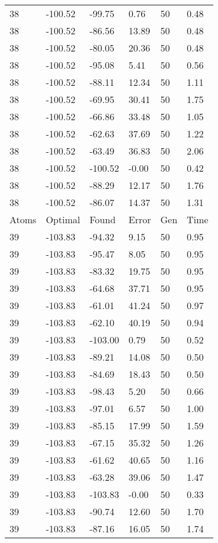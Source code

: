 \documentclass{report}
\begin{document}
\begin{appendix}
\begin{longtable}{llllll}
38 & -100.52 & -99.75 & 0.76 & 50 & 0.48 \\
38 & -100.52 & -86.56 & 13.89 & 50 & 0.48 \\
38 & -100.52 & -80.05 & 20.36 & 50 & 0.48 \\
38 & -100.52 & -95.08 & 5.41 & 50 & 0.56 \\
38 & -100.52 & -88.11 & 12.34 & 50 & 1.11 \\
38 & -100.52 & -69.95 & 30.41 & 50 & 1.75 \\
38 & -100.52 & -66.86 & 33.48 & 50 & 1.05 \\
38 & -100.52 & -62.63 & 37.69 & 50 & 1.22 \\
38 & -100.52 & -63.49 & 36.83 & 50 & 2.06 \\
38 & -100.52 & -100.52 & -0.00 & 50 & 0.42 \\
38 & -100.52 & -88.29 & 12.17 & 50 & 1.76 \\
38 & -100.52 & -86.07 & 14.37 & 50 & 1.31 \\
Atoms & Optimal & Found & Error & Gen & Time \\
39 & -103.83 & -94.32 & 9.15 & 50 & 0.95 \\
39 & -103.83 & -95.47 & 8.05 & 50 & 0.95 \\
39 & -103.83 & -83.32 & 19.75 & 50 & 0.95 \\
39 & -103.83 & -64.68 & 37.71 & 50 & 0.95 \\
39 & -103.83 & -61.01 & 41.24 & 50 & 0.97 \\
39 & -103.83 & -62.10 & 40.19 & 50 & 0.94 \\
39 & -103.83 & -103.00 & 0.79 & 50 & 0.52 \\
39 & -103.83 & -89.21 & 14.08 & 50 & 0.50 \\
39 & -103.83 & -84.69 & 18.43 & 50 & 0.50 \\
39 & -103.83 & -98.43 & 5.20 & 50 & 0.66 \\
39 & -103.83 & -97.01 & 6.57 & 50 & 1.00 \\
39 & -103.83 & -85.15 & 17.99 & 50 & 1.59 \\
39 & -103.83 & -67.15 & 35.32 & 50 & 1.26 \\
39 & -103.83 & -61.62 & 40.65 & 50 & 1.16 \\
39 & -103.83 & -63.28 & 39.06 & 50 & 1.47 \\
39 & -103.83 & -103.83 & -0.00 & 50 & 0.33 \\
39 & -103.83 & -90.74 & 12.60 & 50 & 1.70 \\
39 & -103.83 & -87.16 & 16.05 & 50 & 1.74 \\

\end{longtable}
\end{appendix}
\end{document}
